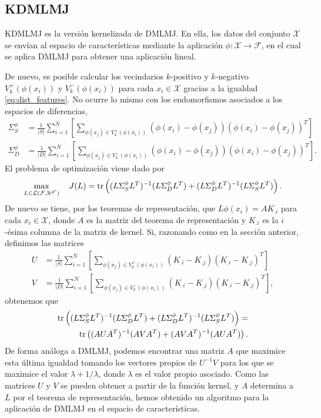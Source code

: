 \subsection{KDMLMJ}

KDMLMJ \cite{dmlmj} es la versión kernelizada de DMLMJ. En ella, los datos del conjunto $\mathcal{X}$ se envían al espacio de características mediante la aplicación $\phi\colon \mathcal{X} \to \mathcal{F}$, en el cual se aplica DMLMJ para obtener una aplicación lineal.

De nuevo, es posible calcular los vecindarios $k$-positivo y $k$-negativo $V_k^+(\phi(x_i))$ y $V_k^-(\phi(x_i))$ para cada $x_i \in \mathcal{X}$ gracias a la igualdad \ref{eq:dist_features}. No ocurre lo mismo con los endomorfismos asociados a los espacios de diferencias,
\begin{align*}
    \Sigma_S^{\phi} &= \frac{1}{|S|}\sum_{i=1}^{N} \left[ \sum_{\phi(x_j) \in V_k^+(\phi(x_i))} (\phi(x_i)-\phi(x_j))(\phi(x_i)-\phi(x_j))^T\right] \\
    \Sigma_D^{\phi} &= \frac{1}{|D|}\sum_{i=1}^{N} \left[ \sum_{\phi(x_j) \in V_k^-(\phi(x_i))} (\phi(x_i)-\phi(x_j))(\phi(x_i)-\phi(x_j))^T\right].
\end{align*}
El problema de optimización viene dado por
\[ \max_{L \in \mathcal{L}(\mathcal{F}, \mathbb{R}^{d'})} \quad J(L) =  \operatorname{tr}\left( (L\Sigma_S^{\phi} L^T)^{-1} (L\Sigma_D^{\phi} L^T) + (L \Sigma_D^{\phi} L^T)^{-1} (L \Sigma_S^{\phi} L^T) \right).\]
 De nuevo se tiene, por los teoremas de representación, que $L\phi(x_i) = AK_{.i}$ para cada $x_i \in \mathcal{X}$, donde $A$ es la matriz del teorema de representación y $K_{.i}$ es la $i$-ésima columna de la matriz de kernel. Si, razonando como en la sección anterior, definimos las matrices
\begin{align*}
    U &= \frac{1}{|S|}\sum_{i=1}^{N} \left[ \sum_{\phi(x_j) \in V_k^+(\phi(x_i))} (K_{.i}-K_{.j})(K_{.i}-K_{.j})^T\right] \\
    V &= \frac{1}{|D|}\sum_{i=1}^{N} \left[ \sum_{\phi(x_j) \in V_k^-(\phi(x_i))} (K_{.i}-K_{.j})(K_{.i}-K_{.j})^T\right],
\end{align*}
obtenemos que
\begin{equation*}
    \begin{split}
        \operatorname{tr}\left( (L\Sigma_S^{\phi} L^T)^{-1} (L\Sigma_D^{\phi} L^T) + (L \Sigma_D^{\phi} L^T)^{-1} (L \Sigma_S^{\phi} L^T) \right) = \\
        \operatorname{tr}\left( (AUA^T)^{-1} (AV A^T) + (A V A^T)^{-1} (A U A^T) \right).
    \end{split}
\end{equation*}
De forma análoga a DMLMJ, podemos encontrar una matriz $A$ que maximice esta última igualdad tomando los vectores propios de $U^{-1}V$ para los que se maximice el valor $\lambda + 1 /\lambda$, donde $\lambda$ es el valor propio asociado. Como las matrices $U$ y $V$ se pueden obtener a partir de la función kernel, y $A$ determina a $L$ por el teorema de representación, hemos obtenido un algoritmo para la aplicación de DMLMJ en el espacio de características.


